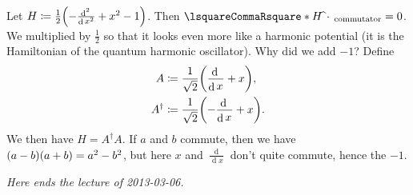 \documentclass[10pt]{article}
\DeclarePairedDelimiter\parentheses{\lparen}{\rparen}
\DeclareMathOperator{\diffd}{d}
\newcommand\ft\widehat
\newcommand{\adj}{^\dagger}
\newcommand\deriv[3][]{\frac{\diffd^{#1} {#3}}{{\diffd {#2}}^{#1}}}
\newcommand{\derivop}[2][]{\deriv[#1]{#2}{}}
\newcommand\pa[1]{\parentheses*{#1}}
\newcommand\commutator[2]{\lsquareCommaRsquare*{#1}{#2}}
\newcommand\placeholder{\,\:\cdot\:\,}
\renewcommand\commutator[2]{\lsquareCommaRsquare*{#1}{#2}_{\mathrm{commutator}}}
\begin{document}
  Let $H \coloneqq \frac{1}{2}\pa{-\derivop[2]{x}+x^2-1}$. Then $\commutator H {\ft\placeholder}=0$. We multiplied by $\frac{1}{2}$ so that it looks even more like a harmonic potential (it is the Hamiltonian of the quantum harmonic oscillator). Why did we add $-1$? Define
  \begin{align*}
    A &\coloneqq \frac{1}{\sqrt 2}\pa{\derivop{x} + x},\\
    A\adj &\coloneqq \frac{1}{\sqrt 2}\pa{-\derivop{x} + x}.
  \end{align*}
  We then have $H = A\adj A$. If $a$ and $b$ commute, then we have $\pa{a-b}\pa{a+b}  = a^2-b^2$, but here $x$ and $\derivop{x}$ don't quite commute, hence the $-1$.

\emph{Here ends the lecture of 2013-03-06.}
\end{document}
